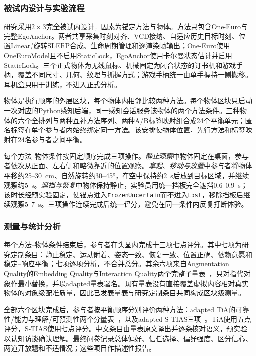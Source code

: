 \documentclass[review]{vgtc}
\begin{document}
\subsubsection{被试内设计与实验流程}

研究采用$2 \times 3$完全被试内设计，因素为锚定方法与物体。方法只包含One-Euro与完整EgoAnchor。两者共享采集时刻对齐、VCD接纳、自适应历史目标时刻、位置Linear/旋转SLERP合成、生命周期管理和逐渲染帧输出；One-Euro使用OneEuroModel且不启用StaticLock，EgoAnchor使用卡尔曼状态估计并启用StaticLock。三个正式物体为无线鼠标、机械固定为闭合状态的订书机和游戏手柄，覆盖不同尺寸、几何、纹理与抓握方式；游戏手柄统一由单手握持一侧搬移。耳机盒只用于训练，不进入正式分析。

物体是执行顺序的外层区块，每个物体内相邻比较两种方法。每个物体区块只启动一次对应的Python感知后端，同一感知会话服务该物体的两个方法条件。三种物体的六个全排列与两种互补方法序列、两种A/B标签映射组合成24个平衡单元；匿名标签在单个参与者内始终绑定同一方法。该安排使物体位置、先行方法和标签映射在24名参与者之间平衡。

每个方法--物体条件按固定顺序完成三项操作。\emph{静止观察}中物体固定在桌面，参与者依次从正面、左右侧和略微靠近的位置观察。\emph{拿起、移动与放置}中参与者将物体平移约25--30~cm、自然旋转约30--45°，在空中保持约2~s后放到目标区域，并继续观察约5~s。\emph{遮挡与恢复}中物体保持静止，实验员用统一挡板完全遮挡0.6--0.9~s；该时长经预实验固定，使锚点进入\texttt{FrozenUncertain}而不进入\texttt{Lost}，移除挡板后继续观察5--7~s。三项操作连续完成后统一评分，避免在同一条件内反复打断体验。

\subsubsection{测量与统计分析}

每个方法--物体条件结束后，参与者在头显内完成十三项七点评分。其中七项为研究定制条目：静止稳定、运动附着、姿态一致、恢复一致、位置正确、依赖意愿和稳定--响应平衡；七项逐项分析，不合并总分。其余六项来自Augmentation Quality的Embedding Quality与Interaction Quality两个完整子量表~\cite{schein2025aq}，只对指代对象作最小替换，并以adapted量表署名。现有量表没有直接覆盖虚拟内容相对真实物体的对象级配准质量，因此已发表量表与研究定制条目共同构成区块级测量。

全部六个区块完成后，参与者按平衡顺序分别评价两种方法：adapted TiA的可靠性/能力与理解/可预测性两个分量表~\cite{koerber2019tia}，以及adapted S-TIAS三项~\cite{mcgrath2025stias}。TiA使用五点评分，S-TIAS使用七点评分。中文条目由量表原文译出并逐条核对语义，预实验以认知访谈确认理解。最终问卷记录总体偏好、信任选择、偏好强度、区分信心、两道开放题和不适情况；这些项目作描述性报告。
\end{document}
